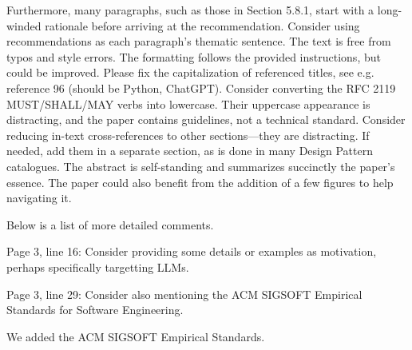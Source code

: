 \documentclass[12pt,english]{reviewresponse}
\begin{document}
\begin{revcomment}
    Furthermore, many paragraphs, such as those in Section 5.8.1, start with a long-winded rationale before arriving at the recommendation. Consider using recommendations as each paragraph's thematic sentence.  The text is free from typos and style errors. The formatting follows the provided instructions, but could be improved. Please fix the capitalization of referenced titles, see e.g. reference 96 (should be Python, ChatGPT). Consider converting the RFC 2119 MUST/SHALL/MAY verbs into lowercase. Their uppercase appearance is distracting, and the paper contains guidelines, not a technical standard. Consider reducing in-text cross-references to other sections—they are distracting. If needed, add them in a separate section, as is done in many Design Pattern catalogues. The abstract is self-standing and summarizes succinctly the paper's essence. The paper could also benefit from the addition of a few figures to help navigating it.

\end{revcomment}
\begin{revresponse}




\end{revresponse}

\begin{revcomment}
    Below is a list of more detailed comments.

Page 3, line 16: Consider providing some details or examples as motivation, perhaps specifically targetting LLMs.
\end{revcomment}
\begin{revresponse}
\end{revresponse}

\begin{revcomment}
Page 3, line 29: Consider also mentioning the  ACM SIGSOFT Empirical Standards for Software Engineering.
\end{revcomment}
\begin{revresponse}
    We added the ACM SIGSOFT Empirical Standards.
\end{revresponse}
\end{document}
